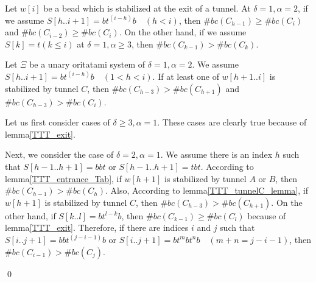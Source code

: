 \documentclass[runningheads]{llncs}
\begin{document}
\begin{lemma}
\label{TTT_exit}
Let $w[i]$ be a bead which is stabilized at the exit of a tunnel.
At $\delta = 1, \alpha =2$, if we assume $S[h..i+1] = bt^{(i-h)}b \quad (h<i)$, then $\#bc(C_{h-1}) \geq \#bc(C_i)$ and $\#bc(C_{i-2}) \geq \#bc(C_i)$.
On the other hand, if we assume $S[k] = t (k \leq i)$ at $\delta =1, \alpha \geq 3$, then $\#bc(C_{k-1}) > \#bc(C_{k})$.
\end{lemma}

\begin{lemma}
\label{TTT_tunnelC_lemma}
Let $\Xi$ be a unary oritatami system of $\delta = 1, \alpha = 2$. We assume $S[h..i+1] = bt^{(i-h)}b \quad (1<h<i)$. If at least one of $w[h+1..i]$ is stabilized by tunnel $C$, then $\#bc(C_{h-3}) > \#bc(C_{h+1})$ and $\#bc(C_{h-3}) > \#bc(C_i)$.
\end{lemma}


Let us first consider cases of $\delta \geq 3, \alpha = 1$. These cases are clearly true because of lemma\ref{TTT_exit}.


Next, we consider the case of $\delta = 2, \alpha = 1$. We assume there is an index $h$ such that $S[h-1..h+1] = bbt$ or $S[h-1..h+1] = tbt$. According to lemma\ref{TTT_entrance_Tab}, if $w[h+1]$ is stabilized by tunnel $A$ or $B$, then $\#bc(C_{h-1}) > \#bc(C_{h})$. Also,  According to lemma\ref{TTT_tunnelC_lemma}, if $w[h+1]$ is stabilized by tunnel $C$, then $\#bc(C_{h-3}) > \#bc(C_{h+1})$.
On the other hand, if $S[k..l] = bt^{l-k}b$, then $\#bc(C_{k-1}) \geq \#bc(C_{l})$ because of lemma\ref{TTT_exit}. Therefore, if there are indices $i$ and $j$ such that $S[i..j+1] = bbt^{(j-i-1)}b$ or $S[i..j+1] = bt^mbt^nb \quad (m + n = j-i-1)$, then $\#bc(C_{i-1}) > \#bc(C_{j})$.

\qed
\end{document}
